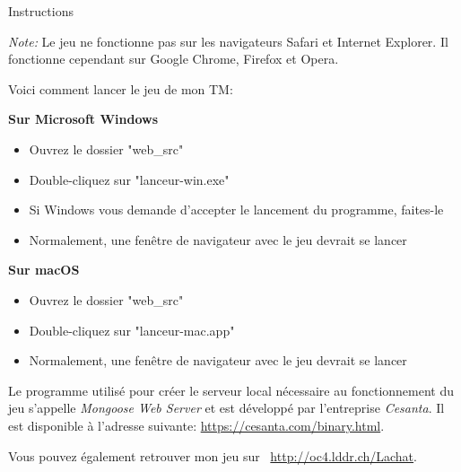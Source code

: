 \documentclass[10pt,a4paper]{article}
\begin{document}

\begin{center}
{\Huge Instructions}
\end{center}

\textit{Note: } Le jeu ne fonctionne pas sur les navigateurs Safari et Internet Explorer. Il fonctionne cependant sur Google Chrome, Firefox et Opera.

\vspace{15pt}

Voici comment lancer le jeu de mon TM:

\vspace{10pt}

\textbf{Sur Microsoft Windows}
\begin{itemize}
\item Ouvrez le dossier "web\_src"
\item Double-cliquez sur "lanceur-win.exe"
\item Si Windows vous demande d'accepter le lancement du programme, faites-le
\item Normalement, une fenêtre de navigateur avec le jeu devrait se lancer
\end{itemize}

\vspace{15pt}

\textbf{Sur macOS}
\begin{itemize}
\item Ouvrez le dossier "web\_src"
\item Double-cliquez sur "lanceur-mac.app"
\item Normalement, une fenêtre de navigateur avec le jeu devrait se lancer
\end{itemize}

\vspace{15pt}

Le programme utilisé pour créer le serveur local nécessaire au fonctionnement du jeu s'appelle \textit{Mongoose Web Server} et est développé par l'entreprise \textit{Cesanta}. Il est disponible à l'adresse suivante: \url{https://cesanta.com/binary.html}.

\vspace{15pt}

Vous pouvez également retrouver mon jeu sur \ \url{http://oc4.lddr.ch/Lachat}.
\end{document}
